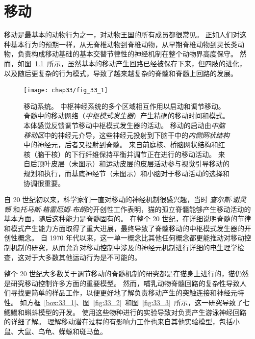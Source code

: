 \chapter{移动} \label{chap:chap33}

移动是最基本的动物行为之一，对动物王国的所有成员都很常见。
正如人们对这种基本行为的预期一样，从无脊椎动物到脊椎动物，从早期脊椎动物到灵长类动物，负责构成移动基础的基本交替节律性的神经机制在整个动物界高度保守。
然而，如图~\ref{fig:33_1}~所示，虽然基本的移动产生回路已经被保存下来，但四肢的进化，以及随后更复杂的行为模式，导致了越来越复杂的脊髓和脊髓上回路的发展。


\begin{figure}[htbp]
	\centering
	\texttt{[image: chap33/fig\_33\_1]}
	\caption{移动系统。
	中枢神经系统的多个区域相互作用以启动和调节移动。
	脊髓中的移动网络（\textit{中枢模式发生器}）产生精确的移动时间和模式。
	本体感觉反馈调节移动中枢模式发生器的活动。
	移动的启动由\textit{中脑移动区}中的神经元介导，这些神经元投射到下脑干中的\textit{内侧网状结构}中的神经元，后者又投射到脊髓。
	来自前庭核、桥脑网状结构和红核（脑干核）的下行纤维保持平衡并调节正在进行的移动活动。
	来自后顶叶皮层（未图示）和运动皮层的皮层活动参与视觉引导移动的规划和执行，而基底神经节（未图示）和小脑对于移动活动的选择和协调很重要。}
	\label{fig:33_1}
\end{figure}


自 20 世纪初以来，科学家们一直对移动的神经机制很感兴趣，当时 \textit{查尔斯$\cdot$谢灵顿} 和\textit{托马斯$\cdot$格雷厄姆-布朗}的开创性工作表明，猫的孤立脊髓能够产生移动活动的基本方面，随后这种能力是脊髓固有的。
在整个 20 世纪，在详细说明脊髓的节律和模式产生能力方面取得了重大进展，最终导致了脊髓移动的中枢模式发生器的开创性概念。
自 1970 年代以来，这一单一概念比其他任何概念都更能推动对移动控制机制的研究，从而允许对移动控制中涉及的神经元机制进行详细的电生理学检查，这对于大多数其他运动行为是不可能的。


整个 20 世纪大多数关于调节移动的脊髓机制的研究都是在猫身上进行的，猫仍然是研究移动控制许多方面的重要模型。
然而，哺乳动物脊髓回路的复杂性导致人们寻找更简单的样品工作，以便更好地了解负责移动产生的突触连接和神经元特性。
如方框~\ref{box:33_1}、图~\ref{fig:33_2}~和图~\ref{fig:33_3}~所示，这一研究导致了七鳃鳗和蝌蚪模型的开发。
使用这些物种进行的实验导致对负责产生游泳神经回路的详细了解。
理解移动潜在过程的有影响力工作也来自其他实验模型，包括小鼠、大鼠、乌龟、蝾螈和斑马鱼。



